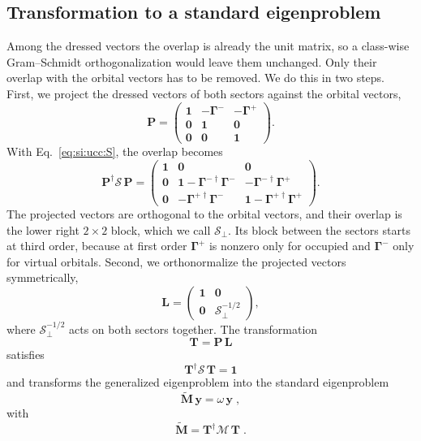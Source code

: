 \documentclass[aip,jcp,reprint,noshowkeys,superscriptaddress]{revtex4-2}
\theoremstyle{plain}
\theoremstyle{definition}
\theoremstyle{remark}
\begin{document}
\subsection{Transformation to a standard eigenproblem}
Among the dressed vectors the overlap is already the unit matrix, so a class-wise Gram--Schmidt orthogonalization would leave them unchanged. Only their overlap with the orbital vectors has to be removed. We do this in two steps. First, we project the dressed vectors of both sectors against the orbital vectors,
\begin{equation}
\mathbf{P}=
\begin{pmatrix}
\mathbf{1} & -\pmb{\Gamma}^{-} & -\pmb{\Gamma}^{+}\\
\mathbf{0} & \mathbf{1} & \mathbf{0}\\
\mathbf{0} & \mathbf{0} & \mathbf{1}
\end{pmatrix} .
\label{eq:si:ucc:P}
\end{equation}
With Eq.~\eqref{eq:si:ucc:S}, the overlap becomes
\begin{equation}
\mathbf{P}^\dagger\mathcal{S}\,\mathbf{P}=
\begin{pmatrix}
\mathbf{1} & \mathbf{0} & \mathbf{0}\\
\mathbf{0} & \mathbf{1}-\pmb{\Gamma}^{-\dagger}\pmb{\Gamma}^{-} & -\pmb{\Gamma}^{-\dagger}\pmb{\Gamma}^{+}\\
\mathbf{0} & -\pmb{\Gamma}^{+\dagger}\pmb{\Gamma}^{-} & \mathbf{1}-\pmb{\Gamma}^{+\dagger}\pmb{\Gamma}^{+}
\end{pmatrix} .
\label{eq:si:ucc:PSP}
\end{equation}
The projected vectors are orthogonal to the orbital vectors, and their overlap is the lower right $2\times2$ block, which we call $\mathcal{S}_\perp$. Its block between the sectors starts at third order, because at first order $\pmb{\Gamma}^{+}$ is nonzero only for occupied and $\pmb{\Gamma}^{-}$ only for virtual orbitals. Second, we orthonormalize the projected vectors symmetrically,
\begin{equation}
\mathbf{L}=
\begin{pmatrix}
\mathbf{1} & \mathbf{0}\\
\mathbf{0} & \mathcal{S}_\perp^{-1/2}
\end{pmatrix} ,
\label{eq:si:ucc:L}
\end{equation}
where $\mathcal{S}_\perp^{-1/2}$ acts on both sectors together. The transformation
\begin{equation}
\mathbf{T}=\mathbf{P}\,\mathbf{L}
\label{eq:si:ucc:T}
\end{equation}
satisfies
\begin{equation}
\mathbf{T}^\dagger\mathcal{S}\,\mathbf{T}=\mathbf{1}
\label{eq:si:ucc:TST}
\end{equation}
and transforms the generalized eigenproblem into the standard eigenproblem
\begin{equation}
\tilde{\mathbf{M}}\,\mathbf{y}=\omega\,\mathbf{y} \;,
\label{eq:si:ucc:std}
\end{equation}
with
\begin{equation}
\tilde{\mathbf{M}}=\mathbf{T}^\dagger\mathcal{M}\,\mathbf{T} \;.
\label{eq:si:ucc:Mt}
\end{equation}
\end{document}
